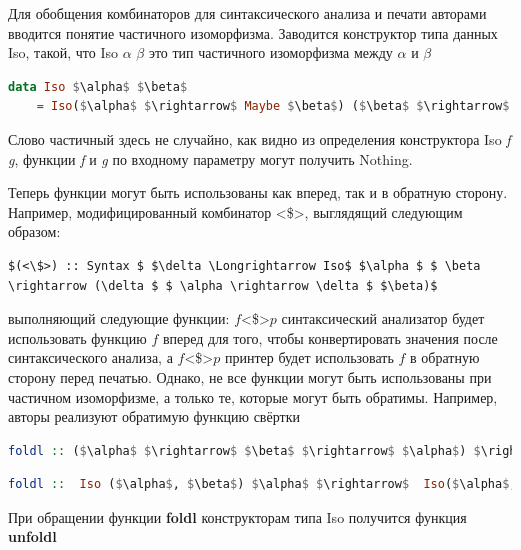 \documentclass{matmex-diploma-custom}
\begin{document}

Для обобщения комбинаторов для синтаксического анализа и печати авторами вводится понятие частичного изоморфизма. Заводится конструктор типа данных Iso, такой, что Iso $\alpha$ $\beta$ это тип частичного изоморфизма между  $\alpha$ и $\beta$
\begin{lstlisting}[mathescape,language = haskell]
data Iso $\alpha$ $\beta$
    = Iso($\alpha$ $\rightarrow$ Maybe $\beta$) ($\beta$ $\rightarrow$ Maybe $\alpha$)
\end{lstlisting}
Слово частичный здесь не случайно, как видно из определения конструктора Iso \textit{f g}, функции \textit{f} и \textit{g} по входному параметру могут получить Nothing. 

Теперь функции могут быть использованы как вперед, так и в обратную сторону. Например, модифицированный комбинатор <\$>, выглядящий следующим образом:

\begin{lstlisting}[mathescape]
$(<\$>) :: Syntax $ $\delta \Longrightarrow Iso$ $\alpha $ $ \beta \rightarrow (\delta $ $ \alpha \rightarrow \delta $ $\beta)$
\end{lstlisting}
выполняющий следующие функции: $f$<\$>$p$ синтаксический анализатор будет использовать функцию $f$ вперед для того, чтобы конвертировать значения после синтаксического анализа, а $f$<\$>$p$ принтер будет использовать $f$ в обратную сторону перед печатью. Однако, не все функции могут быть использованы при частичном изоморфизме, а только те, которые могут быть обратимы. Например, авторы реализуют обратимую функцию свёртки

\begin{lstlisting}[mathescape,language = haskell]
foldl :: ($\alpha$ $\rightarrow$ $\beta$ $\rightarrow$ $\alpha$) $\rightarrow$ $\alpha$ $\rightarrow$ $[\beta]$ $\rightarrow$ $\alpha$
\end{lstlisting}

\begin{lstlisting}[mathescape,language = haskell]
foldl ::  Iso ($\alpha$, $\beta$) $\alpha$ $\rightarrow$  Iso($\alpha$, $[\beta]$) $\alpha$
\end{lstlisting}
При обращении функции \textbf{foldl} конструкторам типа Iso получится функция \textbf{unfoldl}
\end{document}
